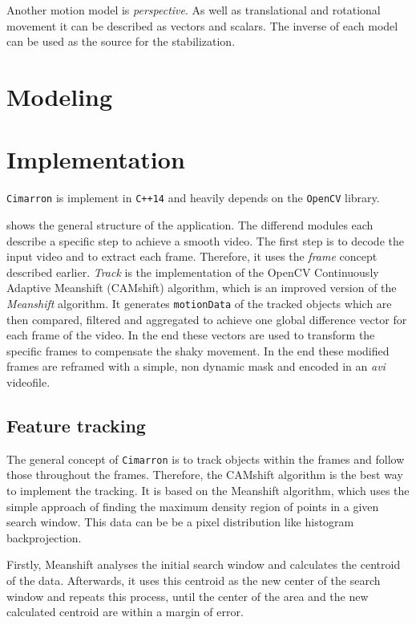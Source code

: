 Another motion model is \textit{perspective}. As well as translational and rotational movement it can be described as vectors and scalars. The inverse of each model can be used as the source for the stabilization.


\section{Modeling}

\section{Implementation}
\texttt{Cimarron} is implement in \texttt{C++14} and heavily depends on the \texttt{OpenCV} library.
\begin{figure}[h!]\centering
\end{figure}
 shows the general structure of the application. The differend modules each describe a specific step to achieve a smooth video. The first step is to decode the input video and to extract each frame. Therefore, it uses the \textit{frame} concept described earlier. \textit{Track} is the implementation of the OpenCV Continuously Adaptive Meanshift (CAMshift) algorithm, which is an improved version of the \textit{Meanshift} algorithm. It generates \texttt{motionData} of the tracked objects which are then compared, filtered and aggregated to achieve one global difference vector for each frame of the video. In the end these vectors are used to transform the specific frames to compensate the shaky movement. In the end these modified frames are reframed with a simple, non dynamic mask and encoded in an \textit{avi} videofile.

\subsection{Feature tracking}
The general concept of \texttt{Cimarron} is to track objects within the frames and follow those throughout the frames. Therefore, the CAMshift algorithm is the best way to implement the tracking. It is based on the Meanshift algorithm, which uses the simple approach of finding the maximum density region of points in a given search window. This data can be be a pixel distribution like histogram backprojection.

Firstly, Meanshift analyses the initial search window and calculates the centroid of the data. Afterwards, it uses this centroid as the new center of the search window and repeats this process, until the center of the area and the new calculated centroid are within a margin of error.


